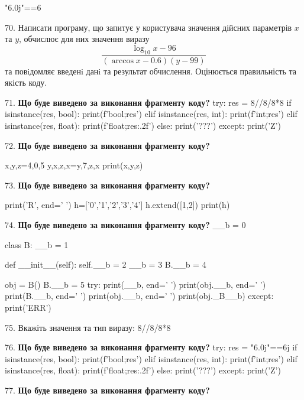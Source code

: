 \documentclass[11pt]{article}
\begin{document}
"6.0j"==6
\par\vspace{5mm}
70. 
Написати програму, що запитує у користувача значення дійсних параметрів $x$ та $y$, обчислює для них значення виразу 
$$\frac{\log_{10} x - 96}{(\arccos x - 0.6) (y - 99)}$$ 
та повiдомляє введенi данi та результат обчислення.
 Оцінюється правильність та якість коду.

\par\vspace{5mm}
71. \textbf{Що буде виведено за виконання фрагменту коду?}
try:
    res = 8//8/8*8
    if isinstance(res, bool):
        print(f'bool;{res}')
    elif isinstance(res, int):
        print(f'int;{res}')
    elif isinstance(res, float):
        print(f'float;{res:.2f}')
    else:
        print('???')
except:
    print('Z')
\par\vspace{5mm}
72. \textbf{Що буде виведено за виконання фрагменту коду?}

x,y,z=4,0,5
y,x,z,x=y,7,z,x
print(x,y,z)
\par\vspace{5mm}
73. \textbf{Що буде виведено за виконання фрагменту коду?}

print('R', end=' ')
h=['0','1','2','3','4']
h.extend([1,2])
print(h)

\par\vspace{5mm}
74. \textbf{Що буде виведено за виконання фрагменту коду?}
__b = 0

class B:
    __b = 1
    
    def __init__(self):
        self.__b = 2
        __b = 3
        B.__b = 4

obj = B()
B.__b = 5
try:
    print(__b, end=' ')
    print(obj.__b, end=' ')
    print(B.__b, end=' ')
    print(obj.__b, end=' ')
    print(obj._B__b)
except:
    print('ERR')
\par\vspace{5mm}
75. 
Вкажіть значення та тип виразу:
8//8/8*8
\par\vspace{5mm}
76. \textbf{Що буде виведено за виконання фрагменту коду?}
try:
    res = "6.0j"==6j
    if isinstance(res, bool):
        print(f'bool;{res}')
    elif isinstance(res, int):
        print(f'int;{res}')
    elif isinstance(res, float):
        print(f'float;{res:.2f}')
    else:
        print('???')
except:
    print('Z')
\par\vspace{5mm}
77. \textbf{Що буде виведено за виконання фрагменту коду?}
\end{document}
